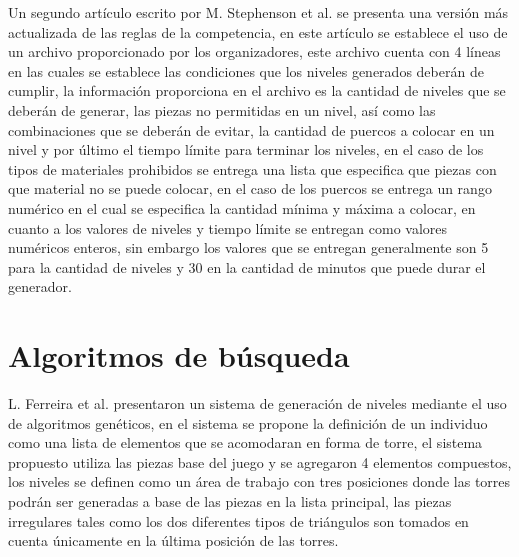 Un segundo artículo escrito por M. Stephenson et al.\cite{Stephenson2018} se
presenta una versión más actualizada de las reglas de la competencia, en este
artículo se establece el uso de un archivo proporcionado por los organizadores,
este archivo cuenta con 4 líneas en las cuales se establece las condiciones que
los niveles generados deberán de cumplir, la información proporciona en el
archivo es la cantidad de niveles que se deberán de generar, las piezas no
permitidas en un nivel, así como las combinaciones que se deberán de evitar, la
cantidad de puercos a colocar en un nivel y por último el tiempo límite para
terminar los niveles, en el caso de los tipos de materiales prohibidos se
entrega una lista que especifica que piezas con que material no se puede
colocar, en el caso de los puercos se entrega un rango numérico en el cual se
especifica la cantidad mínima y máxima a colocar, en cuanto a los valores de
niveles y tiempo límite se entregan como valores numéricos enteros, sin embargo
los valores que se entregan generalmente son 5 para la cantidad de niveles y 30
en la cantidad de minutos que puede durar el generador.

\section{Algoritmos de búsqueda}
\label{section:search-based}

L. Ferreira et al.\cite{Ferreira2014} presentaron un sistema de generación de
niveles mediante el uso de algoritmos genéticos, en el sistema se propone la
definición de un individuo como una lista de elementos que se acomodaran en
forma de torre, el sistema propuesto utiliza las piezas base del juego y se
agregaron 4 elementos compuestos, los niveles se definen como un área de trabajo
con tres posiciones donde las torres podrán ser generadas a base de las piezas
en la lista principal, las piezas irregulares tales como los dos diferentes
tipos de triángulos son tomados en cuenta únicamente en la última posición de
las torres.

